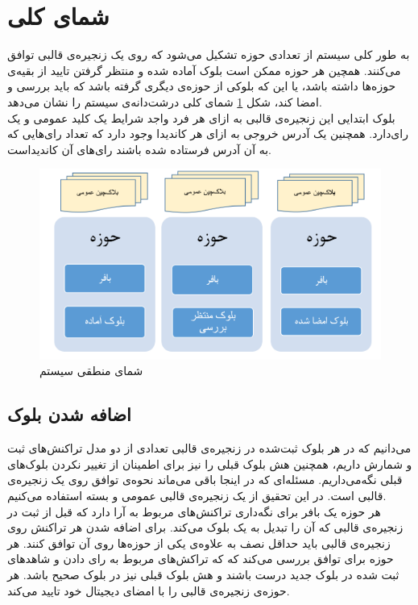 \section{شمای کلی}
به طور کلی سیستم از تعدادی حوزه‌ تشکیل می‌شود که روی یک زنجیره‌ی قالبی توافق می‌کنند. همچین هر حوزه ممکن است بلوک‌ آماده شده و منتظر گرفتن تایید از بقیه‌ی حوزه‌ها داشته باشد، یا این که بلوکی از حوزه‌ی دیگری گرفته باشد که باید بررسی و امضا کند، شکل \ref{fig:bigpic} شمای کلی درشت‌دانه‌ی سیستم را نشان می‌دهد.
\\
بلوک ابتدایی این زنجیره‌ی قالبی به ازای هر فرد واجد شرایط یک کلید عمومی و یک رای‌دارد. همچنین یک آدرس خروجی به ازای هر کاندیدا وجود دارد که تعداد رای‌هایی که به آن آدرس فرستاده شده باشند رای‌های آن‌ کاندیداست. 
 
\begin{figure}[th]
	\centering
	\includegraphics[width=1\linewidth]{blockchain.PNG}
	\caption {شمای منطقی سیستم}
	\label{fig:bigpic}
\end{figure}

\subsection{اضافه شدن بلوک}
می‌دانیم که در هر بلوک ثبت‌شده در زنجیره‌ی قالبی تعدادی از دو مدل تراکنش‌های ثبت و شمارش داریم، همچنین هش بلوک قبلی را نیز برای اطمینان از تغییر نکردن بلوک‌های قبلی نگه‌می‌داریم. مسئله‌ای که در اینجا باقی می‌ماند نحوه‌ی توافق روی یک زنجیره‌ی قالبی است. در این تحقیق از یک زنجیره‌ی قالبی عمومی و بسته استفاده می‌کنیم.
\\
هر حوزه یک بافر برای نگه‌داری تراکنش‌های مربوط به آرا دارد که قبل از ثبت در زنجیره‌ی قالبی که آن را تبدیل به یک بلوک می‌کند. برای اضافه شدن هر تراکنش روی زنجیره‌ی قالبی باید حداقل نصف به علاوه‌ی یکی از حوزه‌ها روی آن توافق کنند. هر حوزه برای توافق بررسی می‌کند که که تراکش‌های مربوط به رای دادن و شاهد‌های ثبت شده در بلوک جدید درست باشند و هش بلوک قبلی نیز در بلوک صحیح باشد. هر حوزه‌ی زنجیره‌ی قالبی را با امضای دیجیتال خود تایید می‌کند. 

